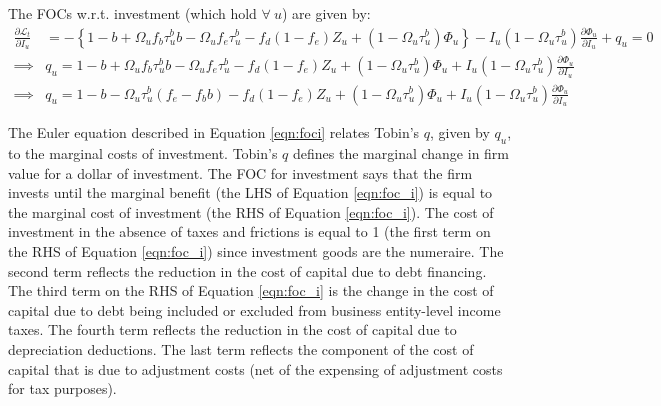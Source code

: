 The FOCs w.r.t. investment (which hold $\forall \ u$) are given by:
 \begin{equation}
\label{eqn:foc_i}
\begin{split}
\frac{\partial \mathcal{L}_{t}}{\partial I_{u}} & = -\left\{1-b+\Omega_{u}f_{b}\tau^{b}_{u}b-\Omega_{u}f_{e}\tau^{b}_{u} - f_{d}(1-f_{e})Z_{u} + (1-\Omega_{u}\tau^{b}_{u})\Phi_{u}\right\} - I_{u}(1-\Omega_{u}\tau^{b}_{u})\frac{\partial \Phi_{u}}{\partial I_{u}} + q_{u} = 0 \\
\implies & q_{u}  = 1-b+\Omega_{u}f_{b}\tau^{b}_{u}b-\Omega_{u}f_{e}\tau^{b}_{u} - f_{d}(1-f_{e})Z_{u} + (1-\Omega_{u}\tau^{b}_{u})\Phi_{u} +  I_{u}(1-\Omega_{u}\tau^{b}_{u})\frac{\partial \Phi_{u}}{\partial I_{u}} \\
\implies & q_{u}  = 1-b-\Omega_{u}\tau^{b}_{u}(f_{e}-f_{b}b) - f_{d}(1-f_{e})Z_{u} + (1-\Omega_{u}\tau^{b}_{u})\Phi_{u} +  I_{u}(1-\Omega_{u}\tau^{b}_{u})\frac{\partial \Phi_{u}}{\partial I_{u}} 
\end{split}
\end{equation}

\noindent\noindent The Euler equation described in Equation \ref{eqn:foci} relates Tobin's $q$, given by $q_{u}$, to the marginal costs of investment.  Tobin's $q$ defines the marginal change in firm value for a dollar of investment. The FOC for investment says that the firm invests until the marginal benefit (the LHS of Equation \ref{eqn:foc_i}) is equal to the marginal cost of investment (the RHS of Equation \ref{eqn:foc_i}).  The cost of investment in the absence of taxes and frictions is equal to 1 (the first term on the RHS of Equation \ref{eqn:foc_i}) since investment goods are the numeraire.  The second term reflects the reduction in the cost of capital due to debt financing.  The third term on the RHS of Equation \ref{eqn:foc_i} is the change in the cost of capital due to debt being included or excluded from business entity-level income taxes.  The fourth term reflects the reduction in the cost of capital due to depreciation deductions.  The last term reflects the component of the cost of capital that is due to adjustment costs (net of the expensing of adjustment costs for tax purposes).



